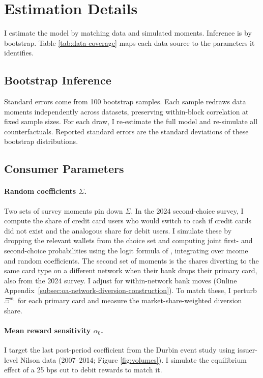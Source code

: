 \documentclass[main.tex]{subfiles}
\begin{document}
\section{Estimation Details}
\label{sec:appendix-estimation}

I estimate the model by matching data and simulated moments. Inference is by bootstrap.
Table \ref{tab:data-coverage} maps each data source to the parameters it identifies.

\subsection{Bootstrap Inference}

Standard errors come from 100 bootstrap samples.
Each sample redraws data moments independently across datasets, preserving within-block correlation at fixed sample sizes.
For each draw, I re-estimate the full model and re-simulate all counterfactuals.
Reported standard errors are the standard deviations of these bootstrap distributions.

\subsection{Consumer Parameters}

\paragraph{Random coefficients $\Sigma$.} Two sets of survey moments pin down $\Sigma$.
In the 2024 second-choice survey, I compute the share of credit card users who would switch to cash if credit cards did not exist and the analogous share for debit users.
I simulate these by dropping the relevant wallets from the choice set and computing joint first- and second-choice probabilities using the logit formula of \textcite{Berry.etal2004}, integrating over income and random coefficients.
The second set of moments is the shares diverting to the same card type on a different network when their bank drops their primary card, also from the 2024 survey.
I adjust for within-network bank moves (Online Appendix~\ref{subsec:oa-network-diversion-construction}).
To match these, I perturb $\Xi^{w_1}$ for each primary card and measure the market-share-weighted diversion share.

\paragraph{Mean reward sensitivity $\alpha_0$.} I target the last post-period coefficient from the Durbin event study using issuer-level Nilson data (2007--2014; Figure \ref{fig:volumes}).
I simulate the equilibrium effect of a 25 bps cut to debit rewards to match it.
\end{document}
